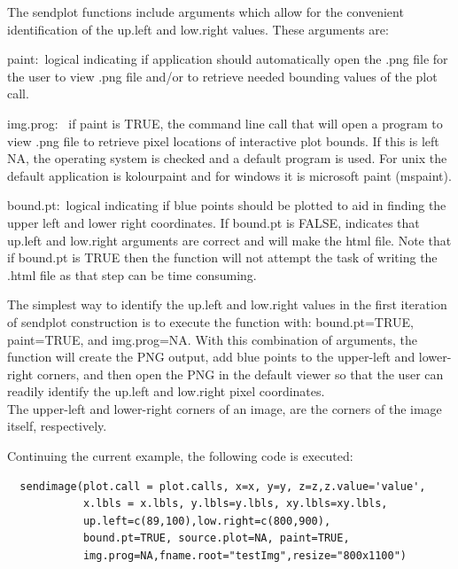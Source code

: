 \documentclass[]{article}
\begin{document}
\indent The sendplot functions  include arguments which allow for the convenient identification of the up.left and low.right values. These arguments are:

\begin{description}
 \item{paint:~}{logical indicating if application should
    automatically open the .png file for the user to view .png file and/or
    to retrieve needed bounding values of the plot call.}

  \item{img.prog:~ }{if paint is TRUE, the command line call that will open
    a program to view .png file to retrieve pixel locations of interactive
    plot bounds. If this is left NA, the operating system is checked and
    a default program is used. For unix the default application is
    kolourpaint and for windows it is microsoft paint (mspaint).}

  \item{bound.pt:~}{logical indicating if blue points should be plotted to
    aid in finding the upper left and lower right coordinates. If
    bound.pt is FALSE, indicates that up.left and low.right arguments
    are correct and will make the html file. Note that if bound.pt is TRUE then the function will not
    attempt the task of writing the .html file as that step can be time consuming.}

 \end{description}
The simplest way to identify the up.left and low.right values in the first iteration of sendplot construction is to execute the function with: bound.pt=TRUE, paint=TRUE, and img.prog=NA. With this combination of arguments, the function will create the PNG output, add blue points to the upper-left and lower-right corners, and then open the PNG in the default viewer so that the user can readily identify the up.left and low.right pixel coordinates. \\

 The upper-left and lower-right corners of an image, are the corners of the image itself, respectively.\newline

\indent Continuing the current example, the following code is executed:
\begin{verbatim}
  sendimage(plot.call = plot.calls, x=x, y=y, z=z,z.value='value',
            x.lbls = x.lbls, y.lbls=y.lbls, xy.lbls=xy.lbls,
            up.left=c(89,100),low.right=c(800,900),
            bound.pt=TRUE, source.plot=NA, paint=TRUE,
            img.prog=NA,fname.root="testImg",resize="800x1100")
\end{verbatim}
\end{document}
